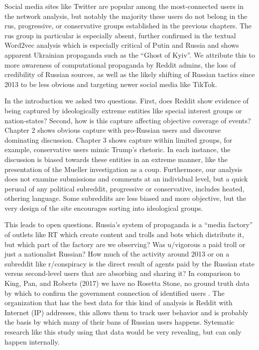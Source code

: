 \documentclass[doublespacing]{utdthesis}
\let\cite=\citep
\begin{document}
Social media sites like Twitter are popular among the most-connected users in the network analysis, but notably the majority these users do not belong in the rus, progressive, or conservative groups established in the previous chapters.
The rus group in particular is especially absent, further confirmed in the textual Word2vec analysis which is especially critical of Putin and Russia and shows apparent Ukrainian propaganda such as the ``Ghost of Kyiv''.
We attribute this to more awareness of computational propaganda by Reddit admins, the loss of credibility of Russian sources, as well as the likely shifting of Russian tactics since 2013 to be less obvious and targeting newer social media like TikTok. 

In the introduction we asked two questions.
First, does Reddit show evidence of being captured by ideologically extreme entities like special interest groups or nation-states?
Second, how is this capture affecting objective coverage of events?
Chapter 2 shows obvious capture with pro-Russian users and discourse dominating discussion.
Chapter 3 shows capture within limited groups, for example, conservative users mimic Trump's rhetoric.
In each instance, the discussion is biased towards these entities in an extreme manner, like the presentation of the Mueller investigation as a coup.
Furthermore, our analysis does not examine submissions and comments at an individual level, but a quick perusal of any political subreddit, progressive or conservative, includes heated, othering language.
Some subreddits are less biased and more objective, but the very design of the site encourages sorting into ideological groups.

This leads to open questions.
Russia's system of propaganda is a ``media factory'' of outlets like RT which create content and trolls and bots which distribute it, but which part of the factory are we observing?
Was u/vigorous a paid troll or just a nationalist Russian?
How much of the activity around 2013 or on a subreddit like r/conspiracy is the direct result of agents paid by the Russian state versus second-level users that are absorbing and sharing it?
In comparison to King, Pan, and Roberts (2017) we have no Rosetta Stone, no ground truth data by which to confirm the government connection of identified users \cite{king2017}. 
The organization that has the best data for this kind of analysis is Reddit with Internet (IP) addresses, this allows them to track user behavior and is probably the basis by which many of their bans of Russian users happens.
Sytematic research like this study using that data would be very revealing, but 
can only happen internally.
\end{document}

